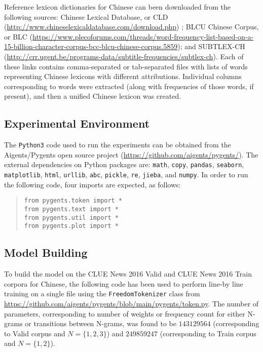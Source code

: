 \documentclass[11pt]{article}
\begin{document}
Reference lexicon dictionaries for Chinese can been downloaded from the following sources: Chinese Lexical Database, or CLD (\url{http://www.chineselexicaldatabase.com/download.php}) \citep[see][]{16};  BLCU Chinese Corpus, or BLC (\url{https://www.plecoforums.com/threads/word-frequency-list-based-on-a-15-billion-character-corpus-bcc-blcu-chinese-corpus.5859}); and SUBTLEX-CH (\url{http://crr.ugent.be/programs-data/subtitle-frequencies/subtlex-ch}). Each of these links contains comma-separated or tab-separated files with lists of words representing Chinese lexicons with different attributions. Individual columns corresponding to words were extracted (along with frequencies of those words, if present), and then a unified Chinese lexicon was created.

\subsection{Experimental Environment}

The \texttt{Python3} code used to run the experiments can be obtained from the Aigents/Pygents open source project (\url{https://github.com/aigents/pygents/}). The external dependencies on Python packages are: \texttt{math}, \texttt{copy}, \texttt{pandas}, \texttt{seaborn}, \texttt{matplotlib}, \texttt{html}, \texttt{urllib}, \texttt{abc}, \texttt{pickle}, \texttt{re}, \texttt{jieba}, and \texttt{numpy}. In order to run the following code, four imports are expected, as follows:

\begin{quote}\begin{small}
\begin{verbatim}
from pygents.token import *
from pygents.text import *
from pygents.util import *
from pygents.plot import *
\end{verbatim}
\end{small}\end{quote}

\subsection{Model Building}

To build the model on the CLUE News 2016 Valid and CLUE News 2016 Train corpora for Chinese, the following code has been used to perform line-by line training on a single file using the \texttt{FreedomTokenizer} class from \url{https://github.com/aigents/pygents/blob/main/pygents/token.py}. The number of parameters, corresponding to number of weights or frequency count for either N-grams or transitions between N-grams, was found to be $143129564$ (corresponding to Valid corpus and $N=\{1,2,3\}$) and $249859247$ (corresponding to Train corpus and $N=\{1,2\}$).
\end{document}
